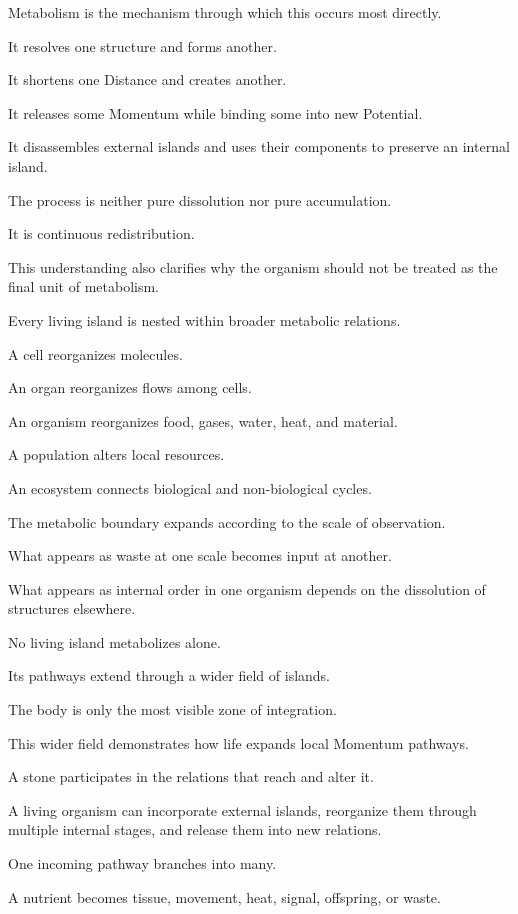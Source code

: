Metabolism is the mechanism through which this occurs most directly.

It resolves one structure and forms another.

It shortens one Distance and creates another.

It releases some Momentum while binding some into new Potential.

It disassembles external islands and uses their components to preserve an internal island.

The process is neither pure dissolution nor pure accumulation.

It is continuous redistribution.

This understanding also clarifies why the organism should not be treated as the final unit of metabolism.

Every living island is nested within broader metabolic relations.

A cell reorganizes molecules.

An organ reorganizes flows among cells.

An organism reorganizes food, gases, water, heat, and material.

A population alters local resources.

An ecosystem connects biological and non-biological cycles.

The metabolic boundary expands according to the scale of observation.

What appears as waste at one scale becomes input at another.

What appears as internal order in one organism depends on the dissolution of structures elsewhere.

No living island metabolizes alone.

Its pathways extend through a wider field of islands.

The body is only the most visible zone of integration.

This wider field demonstrates how life expands local Momentum pathways.

A stone participates in the relations that reach and alter it.

A living organism can incorporate external islands, reorganize them through multiple internal stages, and release them into new relations.

One incoming pathway branches into many.

A nutrient becomes tissue, movement, heat, signal, offspring, or waste.

